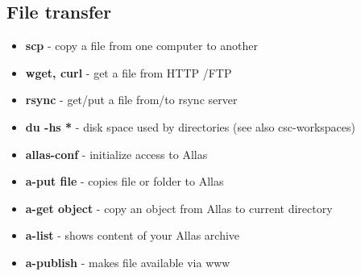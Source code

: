 \documentclass{article}
\begin{document}
\begin{Parallel}{0.48\textwidth}{0.48\textwidth}
{\section*{File transfer}
\begin{itemize}
    \item \textbf{scp} - copy a file from one computer to another
    \item \textbf{wget, curl} - get a file from HTTP /FTP
    \item \textbf{rsync} - get/put a file from/to rsync server
    \item \textbf{du -hs *} - disk space used by directories (see also csc-workspaces)
    \item \textbf{allas-conf} - initialize access to Allas 
    \item \textbf{a-put file} - copies file or folder to Allas 	
    \item \textbf{a-get object} - copy an object from Allas to current directory 
    \item \textbf{a-list} - shows content of your Allas archive
    \item \textbf{a-publish} - makes file available via www
    \\
    \\
\end{itemize}
}
\end{Parallel}
\end{document}
